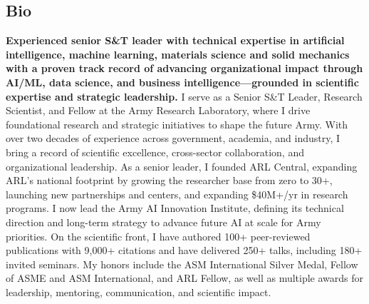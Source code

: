 \documentclass[line,margin,10pt]{res}
\begin{document}
\begin{resume}
{\section{\sc Bio}
\textbf{Experienced senior S\&T leader with technical expertise in artificial intelligence, machine learning, materials science and solid mechanics with a proven track record of advancing organizational impact through AI/ML, data science, and business intelligence---grounded in scientific expertise and strategic leadership.}  I serve as a Senior S\&T Leader, Research Scientist, and Fellow at the Army Research Laboratory, where I drive foundational research and strategic initiatives to shape the future Army. With over two decades of experience across government, academia, and industry, I bring a record of scientific excellence, cross-sector collaboration, and organizational leadership.  As a senior leader, I founded ARL Central, expanding ARL's national footprint by growing the researcher base from zero to 30+, launching new partnerships and centers, and expanding \$40M+/yr in research programs. I now lead the Army AI Innovation Institute, defining its technical direction and long-term strategy to advance future AI at scale for Army priorities.  On the scientific front, I have authored 100+ peer-reviewed publications with 9,000+ citations and have delivered 250+ talks, including 180+ invited seminars. My honors include the ASM International Silver Medal, Fellow of ASME and ASM International, and ARL Fellow, as well as multiple awards for leadership, mentoring, communication, and scientific impact.
}{}

\let\clearpage\relax









\restartnumbering






\end{resume}
\end{document}

